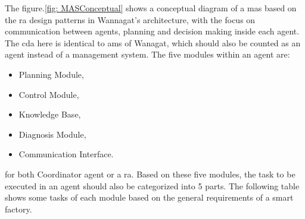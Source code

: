 The figure.\ref{fig: MASConceptual} shows a conceptual diagram of a \gls{mas} based on the \gls{ra} design patterns in Wannagat’s architecture, with the focus on communication between agents, planning and decision making inside each agent. The \gls{cda} here is identical to \gls{ams} of Wanagat, which should also be counted as an agent instead of a management system. The five modules within an agent are: 
\begin{itemize}
\item Planning Module,
\item Control Module,
\item Knowledge Base,
\item Diagnosis Module,
\item Communication Interface.
\end{itemize}

for both Coordinator agent or a \gls{ra}.
Based on these five modules, the task to be executed in an agent should also be categorized into 5 parts. The following table shows some tasks of each module based on the general requirements of a smart factory.



